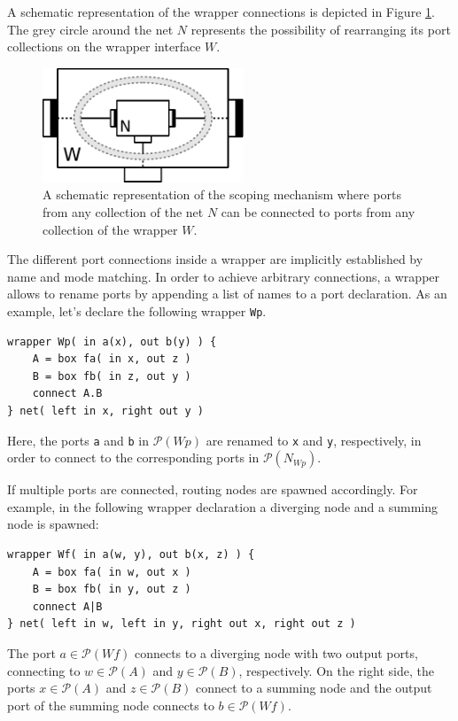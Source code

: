 A schematic representation of the wrapper connections is depicted in Figure \ref{fig_smx_wrapper}.
The grey circle around the net $N$ represents the possibility of rearranging its port collections on the wrapper interface $W$.
\begin{figure}[bht]\begin{center}
\TopFigSpace
    \includegraphics[width=6cm]{fig/wrapper.pdf}
    \CaptionFigSpace
    \caption{A schematic representation of the scoping mechanism where ports from any collection of the net $N$ can be connected to ports from any collection of the wrapper $W$.}
    \label{fig_smx_wrapper}
\BotFigSpace
\end{center}\end{figure}

The different port connections inside a wrapper are implicitly established by name and mode matching.
In order to achieve arbitrary connections, a wrapper allows to rename ports by appending a list of names to a port declaration.
As an example, let's declare the following wrapper \texttt{Wp}.
\begin{lstlisting}[numbers=none]
wrapper Wp( in a(x), out b(y) ) {
    A = box fa( in x, out z )
    B = box fb( in z, out y )
    connect A.B
} net( left in x, right out y )
\end{lstlisting}
Here, the ports \texttt{a} and \texttt{b} in $\mathcal{P}(Wp)$ are renamed to \texttt{x} and \texttt{y}, respectively, in order to connect to the corresponding ports in $\mathcal{P}(N_{Wp})$.

If multiple ports are connected, routing nodes are spawned accordingly.
For example, in the following wrapper declaration a diverging node and a summing node is spawned:
\begin{lstlisting}[numbers=none]
wrapper Wf( in a(w, y), out b(x, z) ) {
    A = box fa( in w, out x )
    B = box fb( in y, out z )
    connect A|B
} net( left in w, left in y, right out x, right out z )
\end{lstlisting}
The port $a \in \mathcal{P}(Wf)$ connects to a diverging node with two output ports, connecting to $w \in \mathcal{P}(A)$ and $y \in \mathcal{P}(B)$, respectively.
On the right side, the ports $x \in \mathcal{P}(A)$ and $z \in \mathcal{P}(B)$ connect to a summing node and the output port of the summing node connects to $b \in \mathcal{P}(Wf)$.

